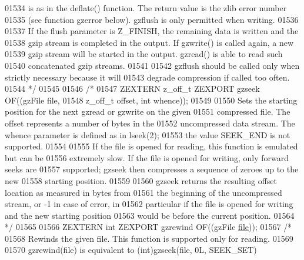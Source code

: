 \begin{DoxyCode}
01534 \textcolor{comment}{   is as in the deflate() function.  The return value is the zlib error number}
01535 \textcolor{comment}{   (see function gzerror below).  gzflush is only permitted when writing.}
01536 \textcolor{comment}{}
01537 \textcolor{comment}{     If the flush parameter is Z\_FINISH, the remaining data is written and the}
01538 \textcolor{comment}{   gzip stream is completed in the output.  If gzwrite() is called again, a new}
01539 \textcolor{comment}{   gzip stream will be started in the output.  gzread() is able to read such}
01540 \textcolor{comment}{   concatenated gzip streams.}
01541 \textcolor{comment}{}
01542 \textcolor{comment}{     gzflush should be called only when strictly necessary because it will}
01543 \textcolor{comment}{   degrade compression if called too often.}
01544 \textcolor{comment}{*/}
01545 
01546 \textcolor{comment}{/*}
01547 \textcolor{comment}{ZEXTERN z\_off\_t ZEXPORT gzseek OF((gzFile file,}
01548 \textcolor{comment}{                                   z\_off\_t offset, int whence));}
01549 \textcolor{comment}{}
01550 \textcolor{comment}{     Sets the starting position for the next gzread or gzwrite on the given}
01551 \textcolor{comment}{   compressed file.  The offset represents a number of bytes in the}
01552 \textcolor{comment}{   uncompressed data stream.  The whence parameter is defined as in lseek(2);}
01553 \textcolor{comment}{   the value SEEK\_END is not supported.}
01554 \textcolor{comment}{}
01555 \textcolor{comment}{     If the file is opened for reading, this function is emulated but can be}
01556 \textcolor{comment}{   extremely slow.  If the file is opened for writing, only forward seeks are}
01557 \textcolor{comment}{   supported; gzseek then compresses a sequence of zeroes up to the new}
01558 \textcolor{comment}{   starting position.}
01559 \textcolor{comment}{}
01560 \textcolor{comment}{     gzseek returns the resulting offset location as measured in bytes from}
01561 \textcolor{comment}{   the beginning of the uncompressed stream, or -1 in case of error, in}
01562 \textcolor{comment}{   particular if the file is opened for writing and the new starting position}
01563 \textcolor{comment}{   would be before the current position.}
01564 \textcolor{comment}{*/}
01565 
01566 ZEXTERN \textcolor{keywordtype}{int} ZEXPORT    gzrewind OF((gzFile \hyperlink{structfile}{file}));
01567 \textcolor{comment}{/*}
01568 \textcolor{comment}{     Rewinds the given file. This function is supported only for reading.}
01569 \textcolor{comment}{}
01570 \textcolor{comment}{     gzrewind(file) is equivalent to (int)gzseek(file, 0L, SEEK\_SET)}

\end{DoxyCode}
